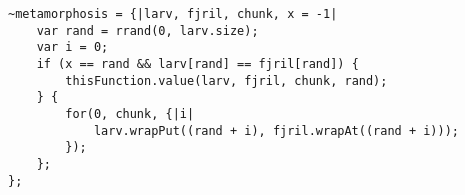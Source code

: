 \documentclass{article}
\begin{document}
\begin{lstlisting}[style=SuperCollider-IDE, caption=Funktion för "metamorfos"]
~metamorphosis = {|larv, fjril, chunk, x = -1|
	var rand = rrand(0, larv.size);
	var i = 0;
	if (x == rand && larv[rand] == fjril[rand]) {
		thisFunction.value(larv, fjril, chunk, rand);
	} {
		for(0, chunk, {|i|
			larv.wrapPut((rand + i), fjril.wrapAt((rand + i)));
		});
	};
};
\end{lstlisting}


  
\end{document}
